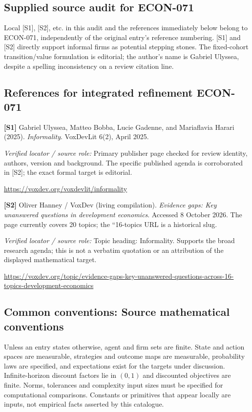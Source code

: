 \documentclass[11pt,a4paper]{article}
\begin{document}
\subsection*{Supplied source audit for ECON-071}
Local [S1], [S2], etc. in this audit and the references immediately below
belong to ECON-071, independently of the original entry's reference numbering.
[S1] and [S2] directly support informal firms as potential stepping stones. The fixed-cohort transition/value formulation is editorial; the author's name is Gabriel Ulyssea, despite a spelling inconsistency on a review citation line.
\subsection*{References for integrated refinement ECON-071}
{\footnotesize\raggedright
\par\noindent\textbf{[S1]} Gabriel Ulyssea, Matteo Bobba, Lucie Gadenne, and Mariaflavia Harari (2025). \emph{Informality}. VoxDevLit 6(2), April 2025.\par \textit{Verified locator / source role:} Primary publisher page checked for review identity, authors, version and background. The specific published agenda is corroborated in [S2]; the exact formal target is editorial.\par \url{https://voxdev.org/voxdevlit/informality}\par\smallskip
\par\noindent\textbf{[S2]} Oliver Hanney / VoxDev (living compilation). \emph{Evidence gaps: Key unanswered questions in development economics}. Accessed 8 October 2026. The page currently covers 20 topics; the ``16-topics URL is a historical slug.\par \textit{Verified locator / source role:} Topic heading: Informality. Supports the broad research agenda; this is not a verbatim quotation or an attribution of the displayed mathematical target.\par \url{https://voxdev.org/topic/evidence-gaps-key-unanswered-questions-across-16-topics-development-economics}\par\smallskip
}

\subsection*{Common conventions: Source mathematical conventions}

Unless an entry states otherwise, agent and firm sets are finite. State and action spaces are measurable, strategies and outcome maps are measurable, probability laws are specified, and expectations exist for the targets under discussion. Infinite-horizon discount factors lie in $(0,1)$ and discounted objectives are finite. Norms, tolerances and complexity input sizes must be specified for computational comparisons. Constants or primitives that appear locally are inputs, not empirical facts asserted by this catalogue.
\end{document}
